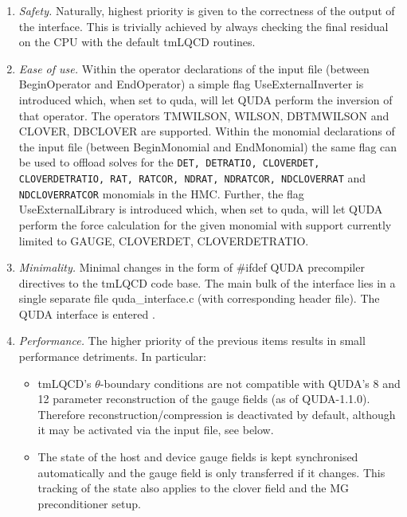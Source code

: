 \begin{enumerate}
	\item \emph{Safety.} Naturally, highest priority is given to the correctness of the output of the interface. 
	This is trivially achieved by always checking the final residual on the CPU with the default tmLQCD routines.
\item \emph{Ease of use.} Within the operator declarations of the input file (between {\ttfamily BeginOperator} and {\ttfamily EndOperator}) a simple flag {\ttfamily UseExternalInverter} is introduced which, when set to {\ttfamily quda}, will let QUDA perform the inversion of that operator. The operators {\ttfamily TMWILSON, WILSON, DBTMWILSON} and {\ttfamily CLOVER, DBCLOVER} are supported. 
    Within the monomial declarations of the input file (between {\ttfamily BeginMonomial} and {\ttfamily EndMonomial}) the same flag can be used to offload solves for the \texttt{DET, DETRATIO, CLOVERDET, CLOVERDETRATIO, RAT, RATCOR, NDRAT, NDRATCOR, NDCLOVERRAT} and \texttt{NDCLOVERRATCOR} monomials in the HMC.
    Further, the flag {\ttfamily UseExternalLibrary} is introduced which, when set to {\ttfamily quda}, will let QUDA perform the force calculation for the given monomial with support currently limited to {\ttfamily GAUGE, CLOVERDET, CLOVERDETRATIO}.
	\item \emph{Minimality.} Minimal changes in the form of {\ttfamily \#ifdef QUDA} precompiler directives to the tmLQCD code base. The main bulk of the interface lies in a single separate file {\ttfamily quda\_interface.c} (with corresponding header file). The QUDA interface is entered .
	\item \emph{Performance.} The higher priority of the previous items results in small performance detriments. In particular:
	\begin{itemize}
		\item tmLQCD's $\theta$-boundary conditions are not compatible with QUDA's 8 and 12 parameter reconstruction of the gauge fields (as of QUDA-1.1.0). Therefore reconstruction/compression is deactivated by default, although it may be activated via the input file, see below.
    \item The state of the host and device gauge fields is kept synchronised automatically and the gauge field is only transferred if it changes. This tracking of the state also applies to the clover field and the MG preconditioner setup.
	\end{itemize}
\end{enumerate}


